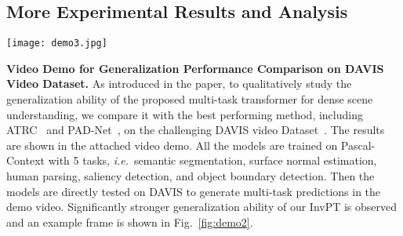 \documentclass[runningheads]{llncs}
\newcommand*{\ie}{\emph{i.e.}}
\begin{document}
\renewcommand{\arraystretch}{1.3}
\begin{table}[ht]
\setlength{\tabcolsep}{4pt}
\vspace{-20pt}
\centering
\caption{Shapes of  matrices in different upsampling stages. Please refer to Sec. 3.4 in paper for the detailed definitions of the notations in the table.}
\label{tab:qkv}
\vspace{-2pt}
\end{table}
\renewcommand{\arraystretch}{1}



\subsection{More Experimental Results and Analysis}

\begin{figure*}[t]
	\centering
	\texttt{[image: demo3.jpg]}
	\vspace{-15pt}
	\caption{An example frame of the demo video for the study of generalization performance. Models are all trained on PASCAL-Context and tested on DAVIS video dataset. Our method yields qualitatively better generalization performance compared to PAD-Net~\cite{padnet} and ATRC~\cite{atrc}.
	}
	\label{fig:demo2}
	\vspace{-15pt}
\end{figure*}

\par\noindent\textbf{Video Demo for Generalization Performance Comparison on DAVIS Video Dataset.}
As introduced in the paper, to qualitatively study the generalization ability of the proposed multi-task transformer for dense scene understanding, we compare it with the best performing method, including ATRC~\cite{atrc} and PAD-Net~\cite{padnet}, on the challenging DAVIS video Dataset~\cite{davis}.
The results are shown in the attached video demo.
All the models are trained on Pascal-Context with 5 tasks, \ie~semantic segmentation, surface normal estimation, human parsing, saliency detection, and object boundary detection.
Then the models are directly tested on DAVIS to generate multi-task predictions in the demo video.
Significantly stronger generalization ability of our InvPT is observed and
an example frame is shown in Fig.~\ref{fig:demo2}.
\end{document}
